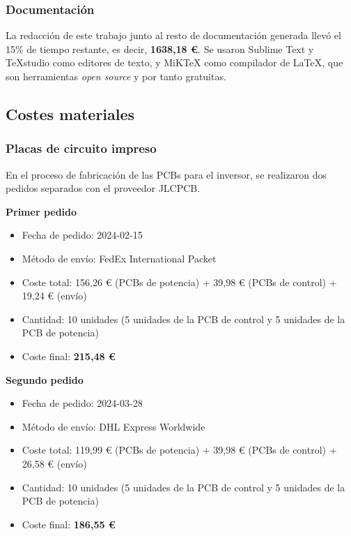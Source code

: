 \subsubsection*{Documentación}
La redacción de este trabajo junto al resto de documentación generada llevó el 15\% de tiempo restante, es decir, \textbf{1638,18 \euro{}}. Se usaron Sublime Text y TeXstudio como editores de texto, y MiKTeX como compilador de \LaTeX, que son herramientas \textit{open source} y por tanto gratuitas.

\subsection*{Costes materiales}

\subsubsection*{Placas de circuito impreso}

En el proceso de fabricación de las PCBs para el inversor, se realizaron dos pedidos separados con el proveedor JLCPCB.

\textbf{Primer pedido}
\begin{itemize}
	\item Fecha de pedido: 2024-02-15
	\item Método de envío: FedEx International Packet
	\item Coste total: 156,26 \euro{} (PCBs de potencia) + 39,98 \euro{} (PCBs de control) + 19,24 \euro{} (envío)
	\item Cantidad: 10 unidades (5 unidades de la PCB de control y 5 unidades de la PCB de potencia)
	\item Coste final: \textbf{215,48 \euro{}}

\end{itemize}

\hspace{1cm}

\textbf{Segundo pedido}
\begin{itemize}
	\item Fecha de pedido: 2024-03-28
	\item Método de envío: DHL Express Worldwide
	\item Coste total: 119,99 \euro{} (PCBs de potencia) + 39,98 \euro{} (PCBs de control) + 26,58 \euro{} (envío)
	\item Cantidad: 10 unidades (5 unidades de la PCB de control y 5 unidades de la PCB de potencia)
	\item Coste final: \textbf{186,55 \euro{}}
\end{itemize}


